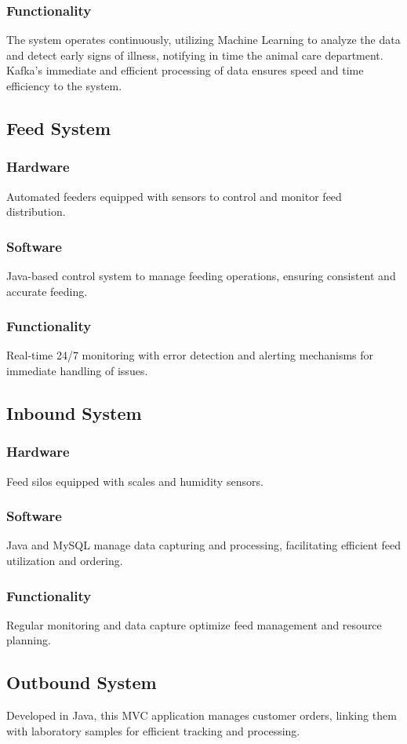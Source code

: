 \documentclass[conference]{IEEEtran}
\begin{document}
\subsubsection{Functionality}
The system operates continuously, utilizing Machine Learning to analyze the data and detect early signs of illness, notifying in time the animal care department. Kafka's immediate and efficient processing of data ensures speed and time efficiency to the system.


\subsection{Feed System}
\subsubsection{Hardware}
Automated feeders equipped with sensors to control and monitor feed distribution.
\subsubsection{Software}
Java-based control system to manage feeding operations, ensuring consistent and accurate feeding.
\subsubsection{Functionality}
Real-time 24/7 monitoring with error detection and alerting mechanisms for immediate handling of issues.

\subsection{Inbound System}
\subsubsection{Hardware}
Feed silos equipped with scales and humidity sensors.
\subsubsection{Software}
Java and MySQL manage data capturing and processing, facilitating efficient feed utilization and ordering.
\subsubsection{Functionality}
Regular monitoring and data capture optimize feed management and resource planning.

\subsection{Outbound System}
Developed in Java, this MVC application manages customer orders, linking them with laboratory samples for efficient tracking and processing.
\end{document}
